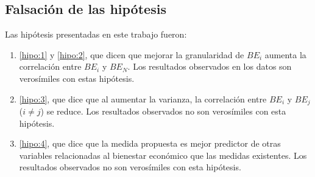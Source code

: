 \subsection{Falsación de las hipótesis}

Las hipótesis presentadas en este trabajo fueron:

\begin{enumerate}
    \item \ref{hipo:1} y \ref{hipo:2}, que dicen que mejorar la granularidad de $BE_i$ aumenta la correlación entre $BE_i$ y $BE_N$. Los resultados observados en los datos son verosímiles con estas hipótesis.
    \item \ref{hipo:3}, que dice que al aumentar la varianza, la correlación entre $BE_i$ y $BE_j$ ($i \neq j$) se reduce. Los resultados observados no son verosímiles con esta hipótesis.
    \item \ref{hipo:4}, que dice que la medida propuesta es mejor predictor de otras variables relacionadas al bienestar económico que las medidas existentes. Los resultados observados no son verosímiles con esta hipótesis.
\end{enumerate}

